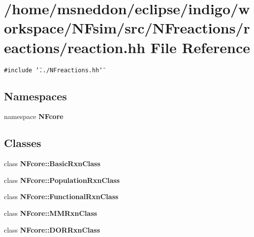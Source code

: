 \section{/home/msneddon/eclipse/indigo/workspace/NFsim/src/NFreactions/reactions/reaction.hh File Reference}
\label{reaction_8hh}


{\tt \#include \char`\"{}../NFreactions.hh\char`\"{}}\par
\subsection*{Namespaces}
\begin{CompactItemize}
\item 
namespace {\bf NFcore}
\end{CompactItemize}
\subsection*{Classes}
\begin{CompactItemize}
\item 
class {\bf NFcore::BasicRxnClass}
\item 
class {\bf NFcore::PopulationRxnClass}
\item 
class {\bf NFcore::FunctionalRxnClass}
\item 
class {\bf NFcore::MMRxnClass}
\item 
class {\bf NFcore::DORRxnClass}
\end{CompactItemize}
